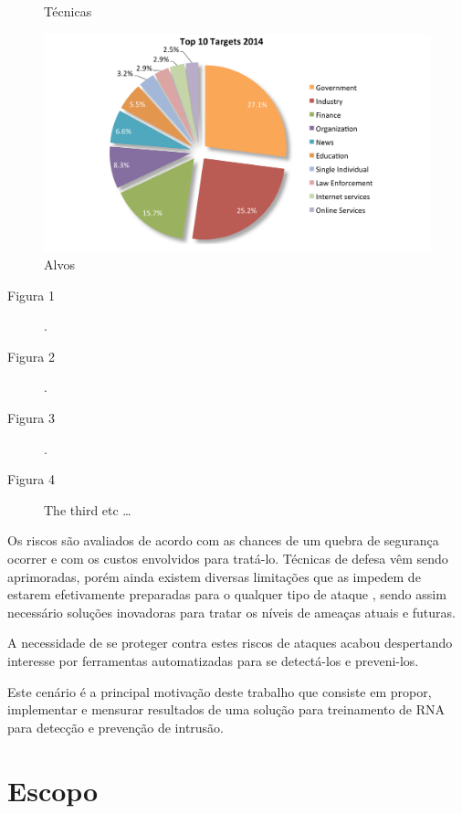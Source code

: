 \begin{figure}
\begin{minipage}{.5\textwidth}
		\caption{Técnicas}
	\end{minipage}
	\begin{minipage}{.5\textwidth}
		\includegraphics[scale=0.2]{Imagens/hackmageddon_targets.png}
		\caption{Alvos}
	\end{minipage}
\end{figure}

\begin{description} 
	\item[Figura 1] . 
	\item[Figura 2] .
	\item[Figura 3] .
	\item[Figura 4] The third etc 
	\ldots 
\end{description}

Os riscos são avaliados de acordo com as chances de um quebra de segurança  ocorrer e com os custos envolvidos para tratá-lo. Técnicas de defesa vêm sendo aprimoradas, porém ainda existem diversas limitações que as impedem de estarem efetivamente preparadas para o qualquer tipo de ataque \cite{CeC}, sendo assim necessário  soluções inovadoras para tratar os níveis de ameaças atuais e futuras. 

A necessidade de se proteger contra estes riscos de ataques acabou despertando interesse por ferramentas automatizadas para se detectá-los e preveni-los.

Este cenário é a principal motivação deste trabalho que consiste em propor, implementar e mensurar resultados de uma solução para treinamento de RNA para detecção e prevenção de intrusão.





\section{Escopo}

